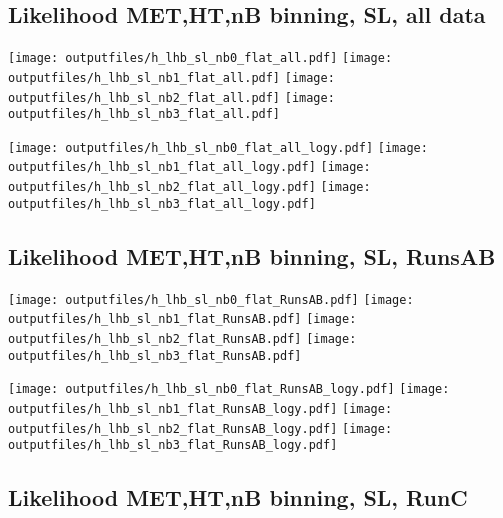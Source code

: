 \documentclass[11pt]{article}
\begin{document}
    \subsection{ Likelihood MET,HT,nB binning, SL, all data}

    \noindent
     \texttt{[image: outputfiles/h\_lhb\_sl\_nb0\_flat\_all.pdf]}
     \texttt{[image: outputfiles/h\_lhb\_sl\_nb1\_flat\_all.pdf]}
     \texttt{[image: outputfiles/h\_lhb\_sl\_nb2\_flat\_all.pdf]}
     \texttt{[image: outputfiles/h\_lhb\_sl\_nb3\_flat\_all.pdf]}

    \noindent
     \texttt{[image: outputfiles/h\_lhb\_sl\_nb0\_flat\_all\_logy.pdf]}
     \texttt{[image: outputfiles/h\_lhb\_sl\_nb1\_flat\_all\_logy.pdf]}
     \texttt{[image: outputfiles/h\_lhb\_sl\_nb2\_flat\_all\_logy.pdf]}
     \texttt{[image: outputfiles/h\_lhb\_sl\_nb3\_flat\_all\_logy.pdf]}

    \clearpage

    \subsection{ Likelihood MET,HT,nB binning, SL, RunsAB}

    \noindent
     \texttt{[image: outputfiles/h\_lhb\_sl\_nb0\_flat\_RunsAB.pdf]}
     \texttt{[image: outputfiles/h\_lhb\_sl\_nb1\_flat\_RunsAB.pdf]}
     \texttt{[image: outputfiles/h\_lhb\_sl\_nb2\_flat\_RunsAB.pdf]}
     \texttt{[image: outputfiles/h\_lhb\_sl\_nb3\_flat\_RunsAB.pdf]}

    \noindent
     \texttt{[image: outputfiles/h\_lhb\_sl\_nb0\_flat\_RunsAB\_logy.pdf]}
     \texttt{[image: outputfiles/h\_lhb\_sl\_nb1\_flat\_RunsAB\_logy.pdf]}
     \texttt{[image: outputfiles/h\_lhb\_sl\_nb2\_flat\_RunsAB\_logy.pdf]}
     \texttt{[image: outputfiles/h\_lhb\_sl\_nb3\_flat\_RunsAB\_logy.pdf]}

    \clearpage

    \subsection{ Likelihood MET,HT,nB binning, SL, RunC}
\end{document}
